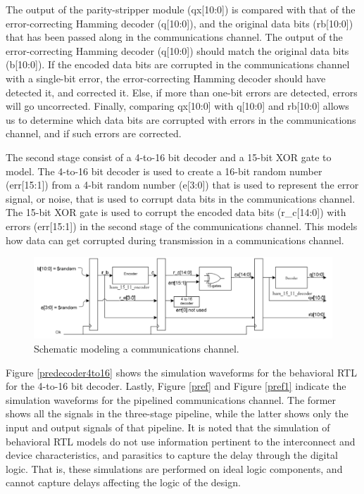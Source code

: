 \documentclass[ee577b,acmnow]{acmtrans2m}
\begin{document}
The output of the parity-stripper module (qx[10:0]) is compared with that of the error-correcting Hamming decoder (q[10:0]), and the original data bits (rb[10:0]) that has been passed along in the communications channel. The output of the error-correcting Hamming decoder (q[10:0]) should match the original data bits (b[10:0]). If the encoded data bits are corrupted in the communications channel with a single-bit error, the error-correcting Hamming decoder should have detected it, and corrected it. Else, if more than one-bit errors are detected, errors will go uncorrected. Finally, comparing qx[10:0] with q[10:0] and rb[10:0] allows us to determine which data bits are corrupted with errors in the communications channel, and if such errors are corrected.

The second stage consist of a 4-to-16 bit decoder and a 15-bit XOR gate to model. The 4-to-16 bit decoder is used to create a 16-bit random number (err[15:1]) from a 4-bit random number (e[3:0]) that is used to represent the error signal, or noise, that is used to corrupt data bits in the communications channel. The 15-bit XOR gate is used to corrupt the encoded data bits (r\_c[14:0]) with errors (err[15:1]) in the second stage of the communications channel. This models how data can get corrupted during transmission in a communications channel.

\begin{figure}
\begin{center}
\includegraphics[width=12cm]{commschannel}
\caption{Schematic modeling a communications channel.}
\label{commch}
\end{center}
\end{figure}


Figure \ref{predecoder4to16} shows the
simulation waveforms for the behavioral RTL for the 4-to-16 bit
decoder. Lastly, Figure \ref{pref} and Figure \ref{pref1} indicate
the simulation waveforms for the pipelined communications
channel. The former shows all the signals in the three-stage
pipeline, while the latter shows only the input and output signals
of that pipeline. It is noted that the simulation of behavioral
RTL models do not use information pertinent to the interconnect
and device characteristics, and parasitics to capture the delay
through the digital logic. That is, these simulations are
performed on ideal logic components, and cannot capture delays
affecting the logic of the design.
\end{document}
